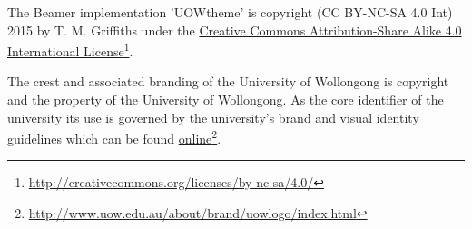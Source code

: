 \documentclass[aspectratio=1610]{beamer}
\begin{document}
\begin{frame}\footnotesize
   The Beamer implementation 'UOWtheme' is copyright (CC BY-NC-SA 4.0 Int) 2015 by T. M. Griffiths under the \href{http://creativecommons.org/licenses/by-sa/4.0/}{Creative Commons Attribution-Share Alike 4.0 International License}\footnote{\url{http://creativecommons.org/licenses/by-nc-sa/4.0/}}.
   
   \begin{center}\ccbysa\end{center}
   
   The crest and associated branding of the University of Wollongong is copyright and the property of the University of Wollongong. As the core identifier of the university its use is governed by the university's brand and visual identity guidelines which can be found \href{http://www.uow.edu.au/about/brand/uowlogo/index.html}{online}\footnote{\url{http://www.uow.edu.au/about/brand/uowlogo/index.html}}.
   
\end{frame}
\end{document}
